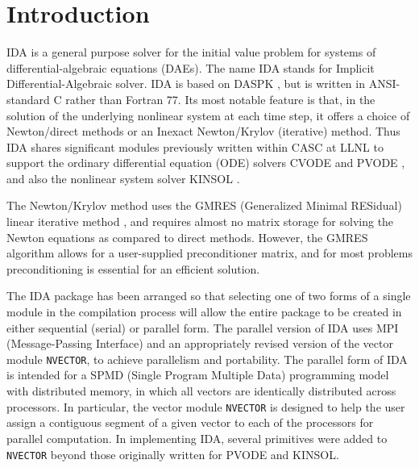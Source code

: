 \documentclass[11pt]{article}
\begin{document}
\normalsize



\maketitle

\setcounter{page}{1}

\section{Introduction}

IDA is a general purpose solver for the initial value problem for
systems of differential-algebraic equations (DAEs).  The name IDA
stands for Implicit Differential-Algebraic solver.  IDA is based on
DASPK \cite{BrHiPe94,BrHiPe98}, but is written in ANSI-standard C
rather than Fortran 77.  Its most notable feature is that, in the
solution of the underlying nonlinear system at each time step, it
offers a choice of Newton/direct methods or an Inexact Newton/Krylov
(iterative) method.  Thus IDA shares significant modules previously
written within CASC at LLNL to support the ordinary differential
equation (ODE) solvers CVODE \cite{CoHi94,CoHi96} and PVODE
\cite{ByHi98,ByHi99}, and also the nonlinear system solver KINSOL
\cite{TaHi98}.

The Newton/Krylov method uses the GMRES (Generalized Minimal RESidual)
linear iterative method \cite{SaSc86}, and requires almost no matrix
storage for solving the Newton equations as compared to direct
methods.  However, the GMRES algorithm allows for a user-supplied
preconditioner matrix, and for most problems preconditioning is
essential for an efficient solution.

The IDA package has been arranged so that selecting one of two forms
of a single module in the compilation process will allow the entire
package to be created in either sequential (serial) or parallel form.
The parallel version of IDA uses MPI (Message-Passing Interface)
\cite{MPI} and an appropriately revised version of the vector module
{\tt NVECTOR}, to achieve parallelism and portability.  The parallel
form of IDA is intended for a SPMD (Single Program Multiple Data)
programming model with distributed memory, in which all vectors are
identically distributed across processors.  In particular, the vector
module {\tt NVECTOR} is designed to help the user assign a contiguous
segment of a given vector to each of the processors for parallel
computation.  In implementing IDA, several primitives were added to
{\tt NVECTOR} beyond those originally written for PVODE and KINSOL.
\end{document}
